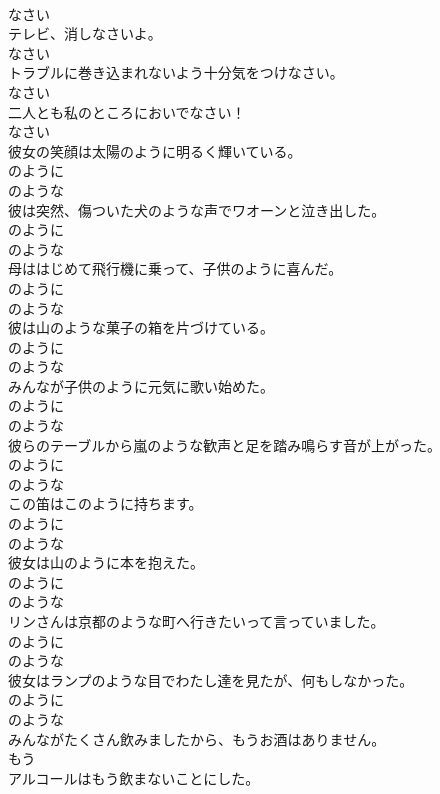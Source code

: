 \documentclass[8pt]{extreport}
\begin{document}
\begin{CJK}{UTF8}{min}
\\	なさい
\\	テレビ、消しなさいよ。	
\\	なさい
\\	トラブルに巻き込まれないよう十分気をつけなさい。	
\\	なさい
\\	二人とも私のところにおいでなさい！	
\\	なさい
\\	彼女の笑顔は太陽のように明るく輝いている。	
\\	のように 
\\	のような
\\	彼は突然、傷ついた犬のような声でワオーンと泣き出した。	
\\	のように 
\\	のような
\\	母ははじめて飛行機に乗って、子供のように喜んだ。	
\\	のように 
\\	のような
\\	彼は山のような菓子の箱を片づけている。	
\\	のように 
\\	のような
\\	みんなが子供のように元気に歌い始めた。	
\\	のように 
\\	のような
\\	彼らのテーブルから嵐のような歓声と足を踏み鳴らす音が上がった。	
\\	のように 
\\	のような
\\	この笛はこのように持ちます。	
\\	のように 
\\	のような
\\	彼女は山のように本を抱えた。	
\\	のように 
\\	のような
\\	リンさんは京都のような町へ行きたいって言っていました。	
\\	のように 
\\	のような
\\	彼女はランプのような目でわたし達を見たが、何もしなかった。	
\\	のように 
\\	のような
\\	みんながたくさん飲みましたから、もうお酒はありません。	
\\	もう
\\	アルコールはもう飲まないことにした。	

\end{CJK}
\end{document}
